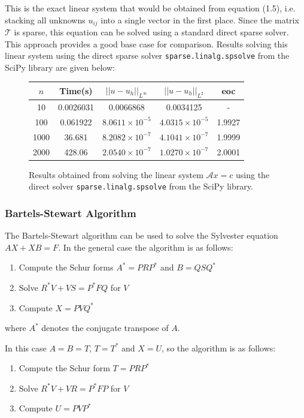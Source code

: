 \documentclass{article}
\numberwithin{equation}{section}
\begin{document}
This is the exact linear system that would be obtained from equation (1.5), i.e. stacking all unknowns $u_{ij}$ into a single vector in the first place. Since the matrix $\mathcal{T}$ is sparse, this equation can be solved using a standard direct sparse solver. This approach provides a good base case for comparison. Results solving this linear system using the direct sparse solver \texttt{sparse.linalg.spsolve} from the SciPy library are given below:

\begin{figure}
\begin{table}[H]
\centering
\begin{tabular}{|c|c|c|c|c|}
\hline
$n$ & Time(s) & $|| u - u_h ||_{L^{\infty}}$ &$|| u - u_h ||_{L^{2}}$ & eoc \\
\hline
10 & 0.0026031 & 0.0066868 & 0.0034125 & - \\
100 & 0.061922 & $8.0611 \times 10^{-5}$ & $4.0315 \times 10^{-5}$ & 1.9927 \\
1000 & 36.681 & $8.2082 \times 10^{-7}$ & $4.1041 \times 10^{-7}$ & 1.9999  \\
2000 & 428.06 & $2.0540 \times 10^{-7}$ & $1.0270 \times 10^{-7}$ & 2.0001 \\
\hline
\end{tabular}
\end{table}
\caption{Results obtained from solving the linear system $\mathcal{A} x = c$ using the direct solver  \texttt{sparse.linalg.spsolve} from the SciPy library.}
\end{figure}

\subsubsection{Bartels-Stewart Algorithm}
The Bartels-Stewart algorithm \cite{Bartels} can be used to solve the Sylvester equation $AX + XB = F$. In the general case the algorithm is as follows:
\begin{enumerate}
\item Compute the Schur forms $A^* = PRP^*$ and $B=QSQ^*$
\item Solve $R^*V + VS = P^*FQ$ for $V$
\item Compute $X=PVQ^*$
\end{enumerate}
where $A^*$ denotes the conjugate transpose of $A$.

In this case $A=B=T$, $T=T^*$ and $X=U$, so the algorithm is as follows:
\begin{enumerate}
\item Compute the Schur form $T=PRP^*$
\item Solve $R^*V + VR = P^*FP$ for $V$
\item Compute $U=PVP^*$
\end{enumerate}
\end{document}
